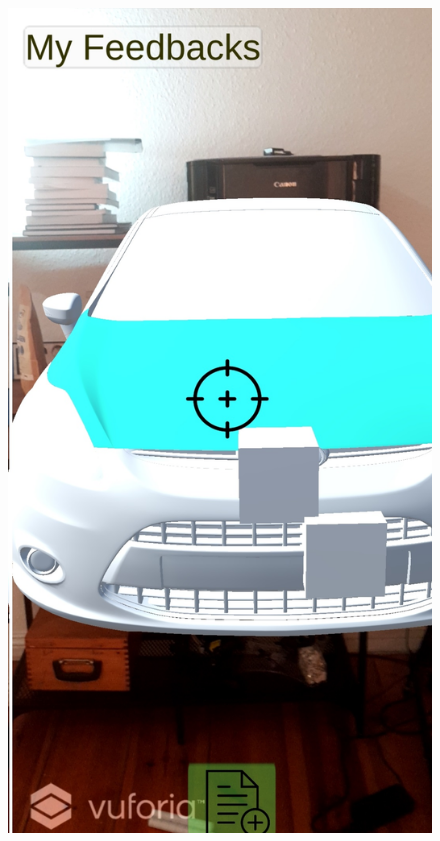 \begin{figure}[H]
	\label{tab:example}
	\centering
	\begin{minipage}{.4\textwidth}
		\centering
		\includegraphics[width=.65\linewidth]{resources/implementation/crossfade_create.jpg}
		\label{fig:crossfade_create}
	\end{minipage}%
	\begin{minipage}{.4\textwidth}
		\centering

\end{minipage}
\end{figure}

